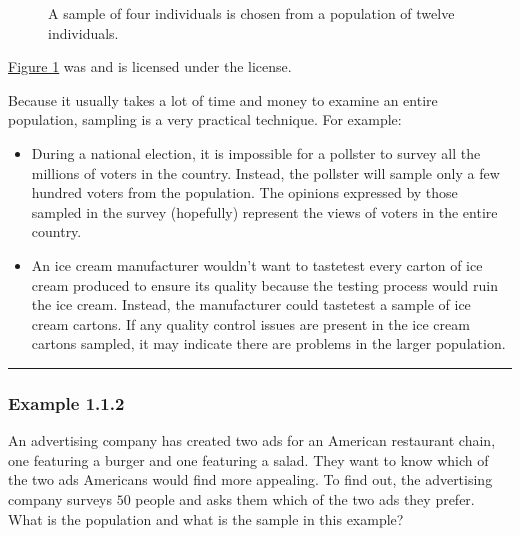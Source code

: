 \documentclass[letterpaper,10pt,english]{jupyterBook}
\begin{document}
\begin{figure}[htbp]
\centering
\capstart

\noindent{}
\caption{A sample of four individuals is chosen from a population of twelve individuals.\sphinxfootnotemark[1]}\label{\detokenize{Ch1 Sampling and Data/1.1 Key Terms in Statistics:sampling-image}}\end{figure}
%
\begin{footnotetext}[1]\sphinxAtStartFootnote
\hyperref[\detokenize{Ch1 Sampling and Data/1.1 Key Terms in Statistics:sampling-image}]{Figure \ref{\detokenize{Ch1 Sampling and Data/1.1 Key Terms in Statistics:sampling-image}}} was  and is licensed under the  license.
%
\end{footnotetext}\ignorespaces 
\sphinxAtStartPar
Because it usually takes a lot of time and money to examine an entire population, sampling is a very practical technique. For example:
\begin{itemize}
\item {} 
\sphinxAtStartPar
During a national election, it is impossible for a pollster to survey all the millions of voters in the country. Instead, the pollster will sample only a few hundred voters from the population. The opinions expressed by those sampled in the survey (hopefully) represent the views of voters in the entire country.

\item {} 
\sphinxAtStartPar
An ice cream manufacturer wouldn’t want to taste\sphinxhyphen{}test every carton of ice cream produced to ensure its quality because the testing process would ruin the ice cream. Instead, the manufacturer could taste\sphinxhyphen{}test a sample of ice cream cartons. If any quality control issues are present in the ice cream cartons sampled, it may indicate there are problems in the larger population.

\end{itemize}


\bigskip\hrule\bigskip



\subsubsection{Example 1.1.2}
\label{\detokenize{Ch1 Sampling and Data/1.1 Key Terms in Statistics:example-1-1-2}}
\sphinxAtStartPar
An advertising company has created two ads for an American restaurant chain, one featuring a burger and one featuring a salad. They want to know which of the two ads Americans would find more appealing. To find out, the advertising company surveys \(50\) people and asks them which of the two ads they prefer. What is the population and what is the sample in this example?
\end{document}
